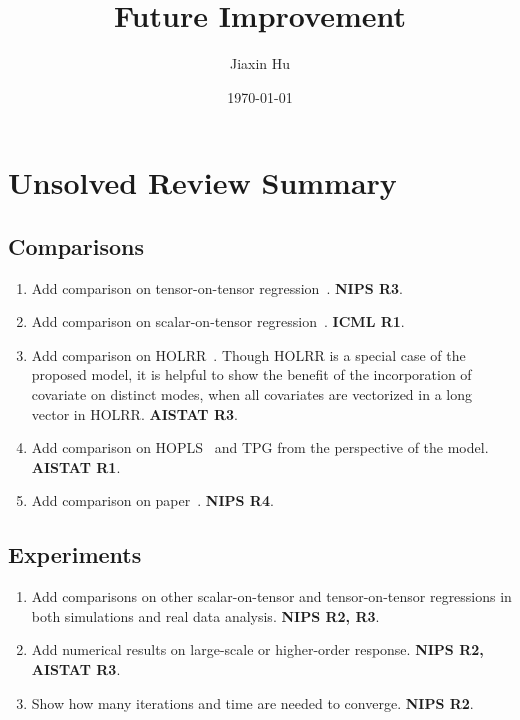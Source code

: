 \documentclass[11pt]{article}
\title{Future Improvement}
\date{\today}
\author{%
Jiaxin Hu
}
\theoremstyle{plain}
\theoremstyle{definition}
\begin{document}

\maketitle


\section{Unsolved Review Summary}

\subsection{Comparisons}
\begin{enumerate}
	\item Add comparison on tensor-on-tensor regression~\citep{lock2018tensor,llosa2018tensor,gahrooei2020multiple,raskutti2015convex}. {\bf NIPS R3}.
	\item Add comparison on scalar-on-tensor regression~\citep{chen2019non, zhou2013tensor}. {\bf ICML R1}.
	\item Add comparison on HOLRR~\citep{rabusseau2016low}. Though HOLRR is a special case of the proposed model, it is helpful to show the benefit of the incorporation of covariate on distinct modes, when all covariates are vectorized in a long vector in HOLRR. {\bf AISTAT R3}.
	\item Add comparison on HOPLS~\citep{zhao2012higher} and TPG \citep{yu2016learning} from the perspective of the model. {\bf AISTAT R1}.
	\item Add comparison on paper~\citep{smith2015positive}. {\bf NIPS R4}.
\end{enumerate}

\subsection{Experiments}
\begin{enumerate}
	\item Add comparisons on other scalar-on-tensor and tensor-on-tensor regressions in both simulations and real data analysis. {\bf NIPS R2, R3}.
	\item Add numerical results on large-scale or higher-order response. {\bf NIPS R2, AISTAT R3}.
	\item Show how many iterations and time are needed to converge. {\bf NIPS R2}.
\end{enumerate}
\end{document}
